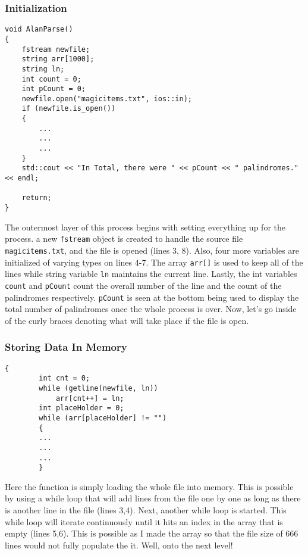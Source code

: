 \documentclass[letterpaper, 10pt]{article}
\begin{document}
\subsubsection{Initialization}
\begin{addmargin}[-5em]{1em}
\begin{small}
\begin{verbatim}
void AlanParse()
{
	fstream newfile;
	string arr[1000];
	string ln;
	int count = 0;
	int pCount = 0;
	newfile.open("magicitems.txt", ios::in);
	if (newfile.is_open())
	{
        ...
        ...
        ...
    }
	std::cout << "In Total, there were " << pCount << " palindromes." << endl;

	return;
}
\end{verbatim}
\end{small}
\end{addmargin}
The outermost layer of this process begins with setting everything up for the process. a new \texttt{fstream} object is created to handle the source file \texttt{magicitems.txt}, and the file is opened (lines 3, 8). Also, four more variables are initialized of varying types on lines 4-7. The array \texttt{arr[]} is used to keep all of the lines while string variable \texttt{ln} maintains the current line. Lastly, the int variables \texttt{count} and \texttt{pCount} count the overall number of the line and the count of the palindromes respectively. \texttt{pCount} is seen at the bottom being used to display the total number of palindromes once the whole process is over. Now, let's go inside of the curly braces denoting what will take place if the file is open.

\subsubsection{Storing Data In Memory}
\begin{addmargin}[-5em]{1em}
\begin{small}
\begin{verbatim}
{
		int cnt = 0;
		while (getline(newfile, ln))
			arr[cnt++] = ln;
		int placeHolder = 0;
		while (arr[placeHolder] != "")
		{
		...
		...
		...
		}
\end{verbatim}
\end{small}
\end{addmargin}
 Here the function is simply loading the whole file into memory. This is possible by using a while loop that will add lines from the file one by one as long as there is another line in the file (lines 3,4). Next, another while loop is started. This while loop will iterate continuously until it hits an index in the array that is empty (lines 5,6). This is possible as I made the array so that the file size of 666 lines would not fully populate the it. Well, onto the next level!
\end{document}
